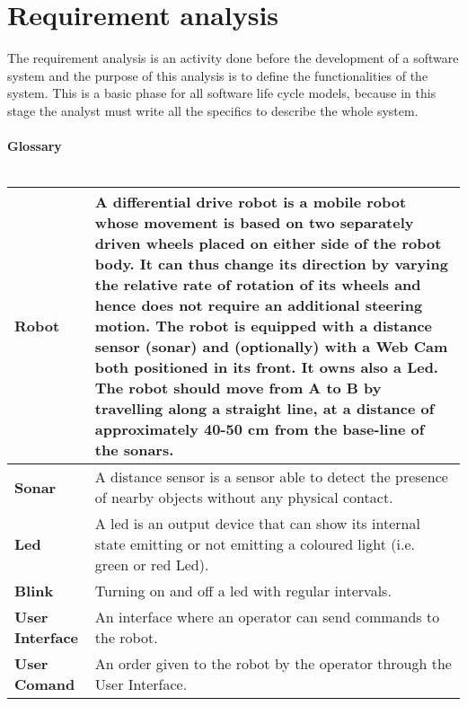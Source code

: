 \section{Requirement analysis}
The requirement analysis is an activity done before the development of a software system and the purpose of this analysis is to define the functionalities of the system. This is a basic phase for all software life cycle models, because in this stage the analyst must write all the specifics to describe the whole system. \\\\
\textbf{Glossary}\\\\
\begin{tabular}{| l | p{11cm} |}
\hline
\textbf{Robot} & A differential drive robot is a mobile robot whose movement is based on two separately driven wheels placed on either side of the robot body. It can thus change its direction by varying the relative rate of rotation of its wheels and hence does not require an additional steering motion. The robot is equipped with a distance sensor (sonar) and (optionally) with a Web Cam both positioned in its front. It owns also a Led. The robot should move from A to B by travelling along a straight line, at a distance of approximately 40-50 cm from the base-line of the sonars. \\ \hline
\textbf{Sonar} & A distance sensor is a sensor able to detect the presence of nearby objects without any physical contact. \\ \hline
\textbf{Led} & A led is an output device that can show its internal state emitting or not emitting a coloured light (i.e. green or red Led). \\ \hline
\textbf{Blink} & Turning on and off a led with regular intervals. \\ \hline
\textbf{User Interface} & An interface where an operator can send commands to the robot. \\ \hline
\textbf{User Comand} & An order given to the robot by the operator through the User Interface. \\
\hline
\end{tabular}




